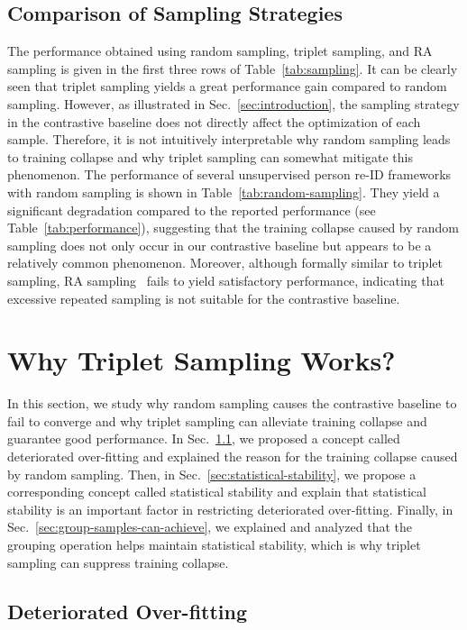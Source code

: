 \documentclass[lettersize,journal]{IEEEtran}
\begin{document}
\subsection{Comparison of Sampling Strategies} \label{sec:comparison-of-sampling}
The performance obtained using random sampling, triplet sampling, and RA sampling is given in the first three rows of Table~\ref{tab:sampling}. 
It can be clearly seen that triplet sampling yields a great performance gain compared to random sampling.
However, as illustrated in Sec.~\ref{sec:introduction}, the sampling strategy in the contrastive baseline does not directly affect the optimization of each sample.
Therefore, it is not intuitively interpretable why random sampling leads to training collapse and why triplet sampling can somewhat mitigate this phenomenon.
The performance of several unsupervised person re-ID frameworks~\cite{SpCL,ICE,CAP} with random sampling is shown in Table~\ref{tab:random-sampling}.
They yield a significant degradation compared to the reported performance (see Table~\ref{tab:performance}), suggesting that the training collapse caused by random sampling does not only occur in our contrastive baseline but appears to be a relatively common phenomenon.
Moreover, although formally similar to triplet sampling, RA sampling~\cite{ra} fails to yield satisfactory performance, indicating that excessive repeated sampling is not suitable for the contrastive baseline.


\section{Why Triplet Sampling Works?} \label{sec:why-triplet-sampling-works}
In this section, we study why random sampling causes the contrastive baseline to fail to converge and why triplet sampling can alleviate training collapse and guarantee good performance. In Sec.~\ref{sec:deteriorated-overfitting}, we proposed a concept called deteriorated over-fitting and explained the reason for the training collapse caused by random sampling. Then, in Sec.~\ref{sec:statistical-stability}, we propose a corresponding concept called statistical stability and explain that statistical stability is an important factor in restricting deteriorated over-fitting.  Finally, in Sec.~\ref{sec:group-samples-can-achieve}, we explained and analyzed that the grouping operation helps maintain statistical stability, which is why triplet sampling can suppress training collapse.

\subsection{Deteriorated Over-fitting}
\label{sec:deteriorated-overfitting}
\end{document}
